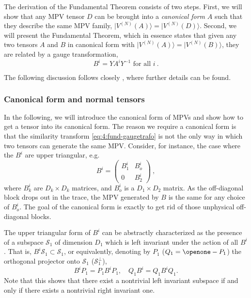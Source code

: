 \documentclass[rmp,aps,reprint,superscriptaddress,nobalancelastpage]{revtex4-1}
\def\Id{{\openone}}
\newcommand{\be}{\begin{equation}}
\newcommand{\ee}{\end{equation}}
\newcommand{\ket}[1]{\vert#1\rangle}
\begin{document}
    The derivation of the Fundamental Theorem consists of two steps.
    First, we will show that any MPV tensor $D$ can be brought into a \emph{canonical form} $A$ such that they describe the same MPV family, $\ket{V^{(N)}(A)}=\ket{V^{(N)}(D)}$.
    Second, we will present the Fundamental Theorem, which in essence states that given any two tensors $A$ and $B$ in canonical form with  $\ket{V^{(N)}(A)}=\ket{V^{(N)}(B)}$, they are related by a gauge transformation,
    \begin{equation}
        \label{eq:4:fund-gaugetrafo}
        B^i=YA^iY^{-1}\mbox{\ for all $i$}\ .
    \end{equation}

    The following discussion follows closely \textcite{cirac:mpdo-rgfp}, where further details can be found.











    \subsubsection{Canonical form and normal tensors}

    In the following, we will introduce the canonical form of MPVs and show how to get a tensor into its canonical form. The reason we require a canonical form is that the similarity transform \eqref{eq:4:fund-gaugetrafo} is not the only way in which two tensors  can generate the same MPV. Consider, for instance, the case where the $B^i$ are upper triangular, e.g.
    \be \label{eq:upper-triangular}
        B^i = \left(\begin{array}{cc} B^i_1 & B^i_o\\ 0 & B^i_2 \end{array}\right)
        \ ,
    \ee
    where $B^i_k$ are $D_k\times D_k$ matrices, and $B^i_o$ is a $D_1\times D_2$ matrix.
    As the off-diagonal block drops out in the trace, the MPV generated by $B$
    is the same for any choice of $B^i_o$.
    The goal of the canonical form is exactly to get rid of those unphysical off-diagonal blocks.

    The upper triangular form of $B^i$ can be abstractly characterized as the presence of a subspace $\mathcal S_1$ of dimension $D_1$ which is left invariant under the action of all $B^i$. That is, $B^i \mathcal S_1\subset \mathcal S_1$, or equivalently, denoting by $P_1$ ($Q_1=\Id-P_1$) the orthogonal projector onto $\mathcal S_1$ ($\mathcal S_1^\perp$),
    \be
        B^i P_1 = P_1 B^i P_1,\quad  Q_1 B^i = Q_1 B^i Q_1.
    \ee
    Note that this shows that there exist a nontrivial left invariant subspace if and only if there exists a nontrivial right invariant one.
\end{document}
